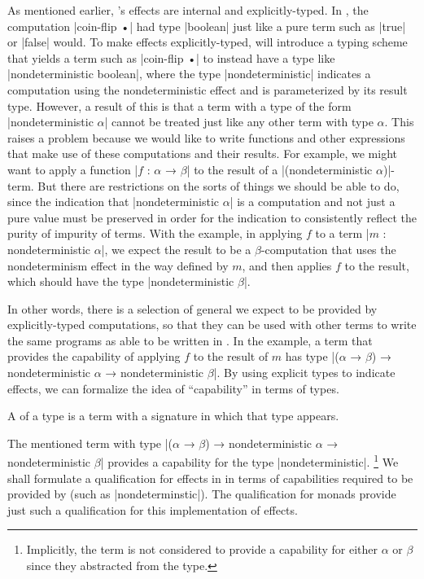 As mentioned earlier, \LangC's effects are internal and explicitly-typed.
In \LangB, the computation \code|coin-flip •| had type \code|boolean| just like a pure term such as \code|true| or \code|false| would.
To make effects explicitly-typed, \LangC will introduce a typing scheme that yields a term such as \code|coin-flip •| to instead have a type like \code|nondeterministic boolean|, where the type \code|nondeterministic| indicates a computation using the nondeterministic effect and is parameterized by its result type.
However, a result of this is that a term with a type of the form \code|nondeterministic $α$| cannot be treated just like any other term with type $α$.
This raises a problem because we would like to write functions and other expressions that make use of these computations and their results.
For example, we might want to apply a function \code|$f$ : $α$ → $β$| to the result of a \code|(nondeterministic $α$)|-term.
But there are restrictions on the sorts of things we should be able to do, since the indication that \code|nondeterministic $α$| is a computation and not just a pure value must be preserved in order for the indication to consistently reflect the purity of impurity of terms.
With the example, in applying $f$ to a term \code|$m$ : nondeterministic $α$|, we expect the result to be a $β$-computation that uses the nondeterminism effect in the way defined by $m$, and then applies $f$ to the result, which should have the type \code|nondeterministic $β$|.

In other words, there is a selection of general  we expect to be provided by explicitly-typed computations, so that they can be used with other terms to write the same programs as able to be written in \LangB.
In the example, a term that provides the capability of applying $f$ to the result of $m$ has type \code|($α$ → $β$) → nondeterministic $α$ → nondeterministic $β$|.
By using explicit types to indicate effects, we can formalize the idea of ``capability'' in terms of types.
\begin{blockdefinition}
A  of a type is a term with a signature in which that type appears.
\end{blockdefinition}
The mentioned term with type \code|($α$ → $β$) → nondeterministic $α$ → nondeterministic $β$| provides a capability for the type \code|nondeterministic|.%
\footnote{
  Implicitly, the term is not considered to provide a capability for either $α$ or $β$ since they abstracted from the type.
}
We shall formulate a qualification for effects in \LangC in terms of capabilities required to be provided by  (such as \code|nondeterminstic|).
The qualification for monads provide just such a qualification for this implementation of effects.

